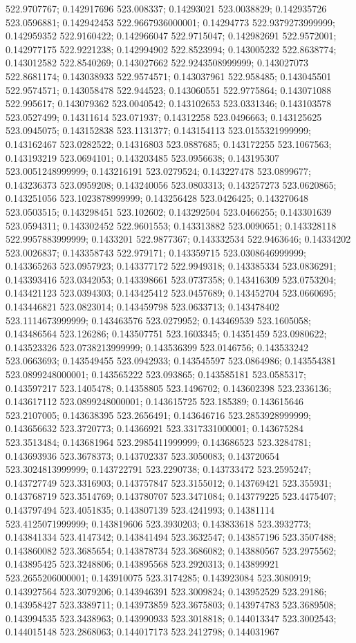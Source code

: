 522.9707767; 0.142917696 523.008337; 0.14293021 523.0038829; 0.142935726 523.0596881; 0.142942453 522.9667936000001; 0.14294773 522.9379273999999; 0.142959352 522.9160422; 0.142966047 522.9715047; 0.142982691 522.9572001; 0.142977175 522.9221238; 0.142994902 522.8523994; 0.143005232 522.8638774; 0.143012582 522.8540269; 0.143027662 522.9243508999999; 0.143027073 522.8681174; 0.143038933 522.9574571; 0.143037961 522.958485; 0.143045501 522.9574571; 0.143058478 522.944523; 0.143060551 522.9775864; 0.143071088 522.995617; 0.143079362 523.0040542; 0.143102653 523.0331346; 0.143103578 523.0527499; 0.14311614 523.071937; 0.14312258 523.0496663; 0.143125625 523.0945075; 0.143152838 523.1131377; 0.143154113 523.0155321999999; 0.143162467 523.0282522; 0.14316803 523.0887685; 0.143172255 523.1067563; 0.143193219 523.0694101; 0.143203485 523.0956638; 0.143195307 523.0051248999999; 0.143216191 523.0279524; 0.143227478 523.0899677; 0.143236373 523.0959208; 0.143240056 523.0803313; 0.143257273 523.0620865; 0.143251056 523.1023878999999; 0.143256428 523.0426425; 0.143270648 523.0503515; 0.143298451 523.102602; 0.143292504 523.0466255; 0.143301639 523.0594311; 0.143302452 522.9601553; 0.143313882 523.0090651; 0.143328118 522.9957883999999; 0.1433201 522.9877367; 0.143332534 522.9463646; 0.14334202 523.0026837; 0.143358743 522.979171; 0.143359715 523.0308646999999; 0.143365263 523.0957923; 0.143377172 522.9949318; 0.143385334 523.0836291; 0.143393416 523.0342053; 0.143398661 523.0737358; 0.143416309 523.0753204; 0.143421123 523.0394303; 0.143425412 523.0457689; 0.143452704 523.0660695; 0.143446821 523.0823014; 0.143459798 523.0633713; 0.143478402 523.1114673999999; 0.143463576 523.0279952; 0.143469539 523.1605058; 0.143486564 523.126286; 0.143507751 523.1603345; 0.14351459 523.0980622; 0.143523326 523.0738213999999; 0.143536399 523.0146756; 0.143533242 523.0663693; 0.143549455 523.0942933; 0.143545597 523.0864986; 0.143554381 523.0899248000001; 0.143565222 523.093865; 0.143585181 523.0585317; 0.143597217 523.1405478; 0.14358805 523.1496702; 0.143602398 523.2336136; 0.143617112 523.0899248000001; 0.143615725 523.185389; 0.143615646 523.2107005; 0.143638395 523.2656491; 0.143646716 523.2853928999999; 0.143656632 523.3720773; 0.14366921 523.3317331000001; 0.143675284 523.3513484; 0.143681964 523.2985411999999; 0.143686523 523.3284781; 0.143693936 523.3678373; 0.143702337 523.3050083; 0.143720654 523.3024813999999; 0.143722791 523.2290738; 0.143733472 523.2595247; 0.143727749 523.3316903; 0.143757847 523.3155012; 0.143769421 523.355931; 0.143768719 523.3514769; 0.143780707 523.3471084; 0.143779225 523.4475407; 0.143797494 523.4051835; 0.143807139 523.4241993; 0.14381114 523.4125071999999; 0.143819606 523.3930203; 0.143833618 523.3932773; 0.143841334 523.4147342; 0.143841494 523.3632547; 0.143857196 523.3507488; 0.143860082 523.3685654; 0.143878734 523.3686082; 0.143880567 523.2975562; 0.143895425 523.3248806; 0.143895568 523.2920313; 0.143899921 523.2655206000001; 0.143910075 523.3174285; 0.143923084 523.3080919; 0.143927564 523.3079206; 0.143946391 523.3009824; 0.143952529 523.29186; 0.143958427 523.3389711; 0.143973859 523.3675803; 0.143974783 523.3689508; 0.143994535 523.3438963; 0.143990933 523.3018818; 0.144013347 523.3002543; 0.144015148 523.2868063; 0.144017173 523.2412798; 0.144031967 